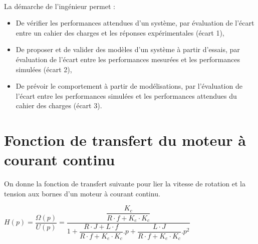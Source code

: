 

 \\

\graphicspath{{../../../img/}}
\begin{center}
\def\svgwidth{\columnwidth}

\end{center}

La démarche de l’ingénieur permet :
\begin{itemize}
 \item De vérifier les performances attendues d’un système, par évaluation de l’écart entre un cahier des charges et les réponses expérimentales (écart 1),
 \item De proposer et de valider des modèles d’un système à partir d’essais, par évaluation de l’écart entre les performances mesurées et les performances simulées (écart 2),
 \item De prévoir le comportement à partir de modélisations, par l’évaluation de l’écart entre les performances simulées et les performances attendues du cahier des charges (écart 3).
\end{itemize}

\newpage

\newpage

\section{Fonction de transfert du moteur à courant continu}

On donne la fonction de transfert suivante pour lier la vitesse de rotation et la tension aux bornes d'un moteur à courant continu.

\begin{center}
$H(p)=\dfrac{\Omega(p)}{U(p)}=\dfrac{\dfrac{K_c}{R\cdot f+K_e\cdot K_c}}{1+\dfrac{R\cdot J+L\cdot f}{R\cdot f+K_e\cdot K_c}.p+\dfrac{L\cdot J}{R\cdot f+K_e\cdot K_c}.p^2}$
\end{center}

